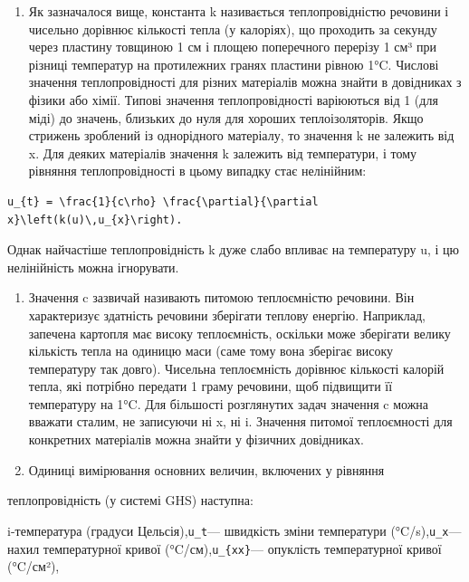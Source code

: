 \documentclass[
  ukrainian,
]{article}
\providecommand{\tightlist}{%
  \setlength{\itemsep}{0pt}\setlength{\parskip}{0pt}}
\begin{document}
\begin{enumerate}
\def\labelenumi{\arabic{enumi}.}
\tightlist
\item
  Як зазначалося вище, константа k називається теплопровідністю речовини
  і чисельно дорівнює кількості тепла (у калоріях), що проходить за
  секунду через пластину товщиною 1 см і площею поперечного перерізу 1
  см³ при різниці температур на протилежних гранях пластини рівною 1°C.
  Числові значення теплопровідності для різних матеріалів можна знайти в
  довідниках з фізики або хімії. Типові значення теплопровідності
  варіюються від 1 (для міді) до значень, близьких до нуля для хороших
  теплоізоляторів. Якщо стрижень зроблений із однорідного матеріалу, то
  значення k не залежить від x. Для деяких матеріалів значення k
  залежить від температури, і тому рівняння теплопровідності в цьому
  випадку стає нелінійним:
\end{enumerate}

\begin{verbatim}
u_{t} = \frac{1}{c\rho} \frac{\partial}{\partial x}\left(k(u)\,u_{x}\right).
\end{verbatim}

Однак найчастіше теплопровідність k дуже слабо впливає на температуру u,
і цю нелінійність можна ігнорувати.

\begin{enumerate}
\def\labelenumi{\arabic{enumi}.}
\setcounter{enumi}{1}
\item
  Значення c зазвичай називають питомою теплоємністю речовини. Він
  характеризує здатність речовини зберігати теплову енергію. Наприклад,
  запечена картопля має високу теплоємність, оскільки може зберігати
  велику кількість тепла на одиницю маси (саме тому вона зберігає високу
  температуру так довго). Чисельна теплоємність дорівнює кількості
  калорій тепла, які потрібно передати 1 граму речовини, щоб підвищити
  її температуру на 1°C. Для більшості розглянутих задач значення c
  можна вважати сталим, не записуючи ні x, ні i. Значення питомої
  теплоємності для конкретних матеріалів можна знайти у фізичних
  довідниках.
\item
  Одиниці вимірювання основних величин, включених у рівняння
\end{enumerate}

теплопровідність (у системі GHS) наступна:

i-температура (градуси Цельсія),\texttt{u\_t}--- швидкість зміни
температури (°C/s),\texttt{u\_x}--- нахил температурної кривої
(°C/см),\texttt{u\_\{xx\}}--- опуклість температурної кривої (°C/см²),
\end{document}
